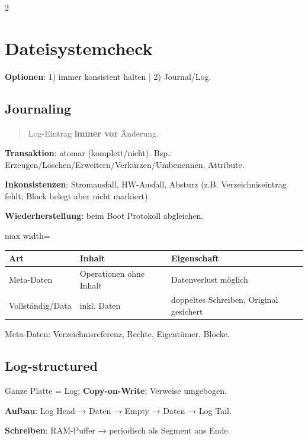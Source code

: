 \documentclass[10pt, a4paper]{article}
\begin{document}
\begin{multicols}{2}
\section{Dateisystemcheck}

\textbf{Optionen}: 1) immer konsistent halten | 2) Journal/Log.



\subsection{Journaling}

\begin{quote}
Log-Eintrag \textbf{immer vor} Änderung.
\end{quote}

\textbf{Transaktion}: atomar (komplett/nicht). Bsp.: Erzeugen/Löschen/Erweitern/Verkürzen/Umbenennen, Attribute.


\textbf{Inkonsistenzen}: Stromausfall, HW-Ausfall, Absturz (z.B. Verzeichniseintrag fehlt; Block belegt aber nicht markiert).


\textbf{Wiederherstellung}: beim Boot Protokoll abgleichen.



{\small
\begin{adjustbox}{max width=\linewidth}
{\scriptsize
\begin{tabular}{lll}
\toprule
\textbf{Art} & \textbf{Inhalt} & \textbf{Eigenschaft} \\
\midrule
Meta-Daten & Operationen ohne Inhalt & Datenverlust möglich \\
Vollständig/Data & inkl. Daten & doppeltes Schreiben, Original gesichert \\
\bottomrule
\end{tabular}
}
\end{adjustbox}
}


Meta-Daten: Verzeichnisreferenz, Rechte, Eigentümer, Blöcke.



\subsection{Log-structured}

Ganze Platte = Log; \textbf{Copy-on-Write}; Verweise umgebogen.


\textbf{Aufbau}: Log Head → Daten → Empty → Daten → Log Tail.


\textbf{Schreiben}: RAM-Puffer → periodisch als Segment ans Ende.



\end{multicols}
\end{document}
